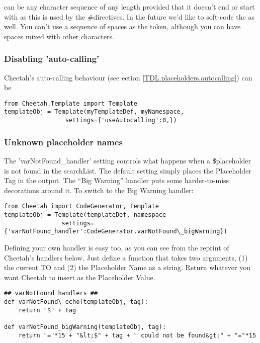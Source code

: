  can be any character sequence of any length
provided that it doesn't end or start with \code{\#} as this is used by the
\#directives.  In the future we'd like to soft-code the
 as well.  You can't use a sequence of spaces as
the token, although you can have spaces mixed with other characters.


\subsubsection{Disabling 'auto-calling'}

Cheetah's auto-calling behaviour (see ection \ref{TDL.placeholders.autocalling}) can be 

\begin{verbatim}
from Cheetah.Template import Template
templateObj = Template(myTemplateDef, myNamespace, 
                 settings={'useAutocalling':0,})
\end{verbatim}


\subsubsection{Unknown placeholder names}

The 'varNotFound\_handler' setting controls what happens when a \$placeholder
is not found in the searchList.  The default setting simply places the
Placeholder Tag in the output.  The ``Big Warning'' handler puts some
harder-to-miss decorations around it.  To switch to the Big Warning handler:

\begin{verbatim}
from Cheetah import CodeGenerator, Template
templateObj = Template(templateDef, namespace
                settings={'varNotFound_handler':CodeGenerator.varNotFound\_bigWarning})
\end{verbatim}

Defining your own handler is easy too, as you can see from the reprint of
Cheetah's handlers below.  Just define a function that takes two arguments, 
(1) the current TO and (2) the Placeholder Name as a string.  Return whatever
you want Cheetah to insert as the Placeholder Value.

\begin{verbatim}
## varNotFound handlers ##
def varNotFound\_echo(templateObj, tag):
    return "$" + tag

def varNotFound_bigWarning(templateObj, tag):
    return "="*15 + "&lt;$" + tag + " could not be found&gt;" + "="*15
    
\end{verbatim}

